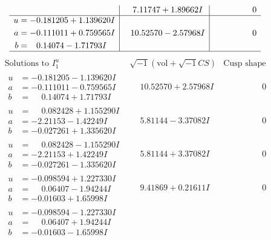 \documentclass[1p]{elsarticle_modified}
\theoremstyle{definition}
\newcommand{\I}{\sqrt{-1}}
\begin{document}
$$\begin{array}{c|c|c}
 & \phantom{-}7.11747 + 1.89662 I & \phantom{-0.000000 } 0 \\ \hline\begin{aligned}
u &= -0.181205 + 1.139620 I \\
a &= -0.111011 + 0.759565 I \\
b &= \phantom{-}0.14074 - 1.71793 I\end{aligned}
 & \phantom{-}10.52570 - 2.57968 I & \phantom{-0.000000 } 0\\
 \hline 
 \end{array}$$\newpage$$\begin{array}{c|c|c}  
\text{Solutions to }I^u_{1}& \I (\text{vol} + \sqrt{-1}CS) & \text{Cusp shape}\\
 \hline 
\begin{aligned}
u &= -0.181205 - 1.139620 I \\
a &= -0.111011 - 0.759565 I \\
b &= \phantom{-}0.14074 + 1.71793 I\end{aligned}
 & \phantom{-}10.52570 + 2.57968 I & \phantom{-0.000000 } 0 \\ \hline\begin{aligned}
u &= \phantom{-}0.082428 + 1.155290 I \\
a &= -2.21153 - 1.42249 I \\
b &= -0.027261 + 1.335620 I\end{aligned}
 & \phantom{-}5.81144 - 3.37082 I & \phantom{-0.000000 } 0 \\ \hline\begin{aligned}
u &= \phantom{-}0.082428 - 1.155290 I \\
a &= -2.21153 + 1.42249 I \\
b &= -0.027261 - 1.335620 I\end{aligned}
 & \phantom{-}5.81144 + 3.37082 I & \phantom{-0.000000 } 0 \\ \hline\begin{aligned}
u &= -0.098594 + 1.227330 I \\
a &= \phantom{-}0.06407 - 1.94244 I \\
b &= -0.01603 + 1.65998 I\end{aligned}
 & \phantom{-}9.41869 + 0.21611 I & \phantom{-0.000000 } 0 \\ \hline\begin{aligned}
u &= -0.098594 - 1.227330 I \\
a &= \phantom{-}0.06407 + 1.94244 I \\
b &= -0.01603 - 1.65998 I\end{aligned}

\end{array}$$
\end{document}
